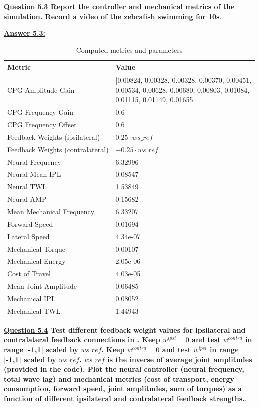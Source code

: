 \documentclass{cmc}
\begin{document}
\textbf{\underline{Question 5.3} Report the controller and mechanical metrics of the simulation.  Record a video of the zebrafish swimming for 10s}.

\textbf{\underline{Answer 5.3:} }

\begin{table}[h!]
\centering
\begin{tabular}{|l|l|}
\hline
\textbf{Metric} & \textbf{Value} \\
\hline
CPG Amplitude Gain & \makecell[r]{[0.00824, 0.00328, 0.00328, 0.00370, 0.00451,\\
                                   0.00534, 0.00628, 0.00680, 0.00803, 0.01084,\\
                                   0.01115, 0.01149, 0.01655]} \\
CPG Frequency Gain & 0.6 \\
CPG Frequency Offset & 0.6 \\
Feedback Weights (ipsilateral) & $0.25 \cdot ws\_ref$ \\
Feedback Weights (contralateral) & $-0.25 \cdot ws\_ref$ \\
\hline
Neural Frequency & 6.32996 \\
Neural Mean IPL & 0.08547 \\
Neural TWL & 1.53849 \\
Neural AMP & 0.15682 \\
Mean Mechanical Frequency & 6.33207 \\
Forward Speed & 0.01694 \\
Lateral Speed & 4.34e-07 \\
Mechanical Torque & 0.00107 \\
Mechanical Energy & 2.05e-06 \\
Cost of Travel & 4.03e-05 \\
Mean Joint Amplitude & 0.06485 \\
Mechanical IPL & 0.08052 \\
Mechanical TWL & 1.44943 \\
\hline
\end{tabular}
\caption{Computed metrics and parameters}
\label{tab:metrics_full}
\end{table}

\textbf{\underline{Question 5.4} Test different feedback weight values for ipsilateral and contralateral feedback connections in . Keep $w^{ipsi}=0$ and test $w^{contra}$ in range [-1,1] scaled by $ws\_ref$. Keep $w^{contra}=0$ and test $w^{ipsi}$ in range [-1,1] scaled by $ws\_ref$. $ws\_ref$ is the inverse of average joint amplitudes (provided in the code). Plot the neural controller (neural frequency, total wave lag) and mechanical metrics (cost of transport, energy consumption, forward speed, joint amplitudes, sum of torques) as a function of different ipsilateral and contralateral feedback strengths.}.
\end{document}
